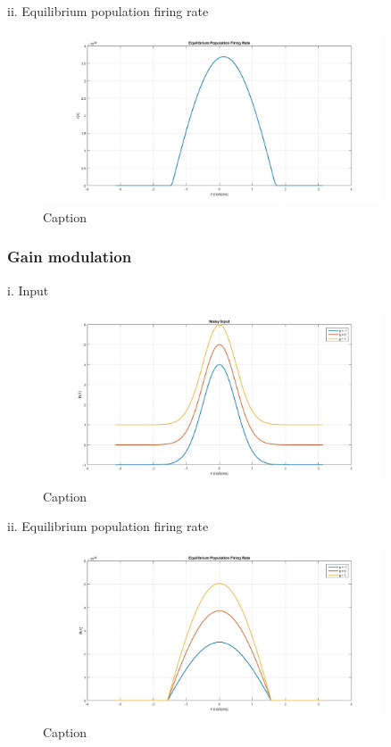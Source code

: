 \documentclass{article}
\begin{document}
ii. Equilibrium population firing rate
\begin{figure}[H] 
	\begin{center}
		\includegraphics[width=0.9\textwidth]{Section1/Part3/3a_ii.jpg}
		\caption{Caption \label{Q2a_iii_g2}}
	\end{center}
\end{figure}

\subsubsection{Gain modulation}
i. Input
\begin{figure}[H] 
	\begin{center}
		\includegraphics[width=0.9\textwidth]{Section1/Part3/3b_i.jpg}
		\caption{Caption \label{Q2a_iii_g2}}
	\end{center}
\end{figure}

ii. Equilibrium population firing rate
\begin{figure}[H] 
	\begin{center}
		\includegraphics[width=0.9\textwidth]{Section1/Part3/3b_ii.jpg}
		\caption{Caption \label{Q2a_iii_g2}}
	\end{center}
\end{figure}
\end{document}

